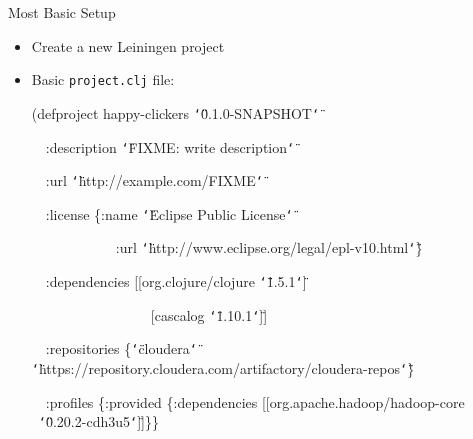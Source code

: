 \documentclass{beamer}
\renewcommand{\textquotedbl}{\texttt{\char`\"}}
\begin{document}
\begin{frame}[allowframebreaks]{Most Basic Setup}
  \begin{itemize}
  \item Create a new Leiningen project
  \item Basic \texttt{project.clj} file:\\
\begin{small}
{\ttfamily\color{black}
%
(defproject happy-clickers
\textcolor[rgb]{0.54509807,0.13333334,0.32156864}{{\textquotedbl}0.1.0-SNAPSHOT{\textquotedbl}}}

{\ttfamily\color{black}
\ \ \textcolor[rgb]{0.28235295,0.23921569,0.54509807}{:description}
\textcolor[rgb]{0.54509807,0.13333334,0.32156864}{{\textquotedbl}}\textcolor[rgb]{0.54509807,0.13333334,0.32156864}{FIXME:
write description{\textquotedbl}}}

{\ttfamily\color{black}
\ \ \textcolor[rgb]{0.28235295,0.23921569,0.54509807}{:url}
\textcolor[rgb]{0.54509807,0.13333334,0.32156864}{{\textquotedbl}http://example.com/FIXME{\textquotedbl}}}

{\ttfamily\color{black}
\ \ \textcolor[rgb]{0.28235295,0.23921569,0.54509807}{:license}
\{\textcolor[rgb]{0.28235295,0.23921569,0.54509807}{:name}
\textcolor[rgb]{0.54509807,0.13333334,0.32156864}{{\textquotedbl}Eclipse
Public License{\textquotedbl}}}

{\ttfamily\color{black}
\ \ \ \ \ \ \ \ \ \ \ \ \textcolor[rgb]{0.28235295,0.23921569,0.54509807}{:url}
\textcolor[rgb]{0.54509807,0.13333334,0.32156864}{{\textquotedbl}http://www.eclipse.org/legal/epl-v10.html{\textquotedbl}}\}}

{\ttfamily\color{black}
\ \ \textcolor[rgb]{0.28235295,0.23921569,0.54509807}{:dependencies}
[[org.clojure/clojure
\textcolor[rgb]{0.54509807,0.13333334,0.32156864}{{\textquotedbl}1.5.1{\textquotedbl}}]}

{\ttfamily\color{black}
\ \ \ \ \ \ \ \ \ \ \ \ \ \ \ \ \ [cascalog
\textcolor[rgb]{0.54509807,0.13333334,0.32156864}{{\textquotedbl}1.10.1{\textquotedbl}}]]}

{\ttfamily\color{black}
\ \ \textcolor[rgb]{0.28235295,0.23921569,0.54509807}{:repositories}
\{\textcolor[rgb]{0.54509807,0.13333334,0.32156864}{{\textquotedbl}cloudera{\textquotedbl}}
\textcolor[rgb]{0.54509807,0.13333334,0.32156864}{{\textquotedbl}https://repository.cloudera.com/artifactory/cloudera-repos{\textquotedbl}}\}}

{\ttfamily\color{black}
\ \ \textcolor[rgb]{0.28235295,0.23921569,0.54509807}{:profiles}
\{\textcolor[rgb]{0.28235295,0.23921569,0.54509807}{:provided}
\{\textcolor[rgb]{0.28235295,0.23921569,0.54509807}{:dependencies}
[[org.apache.hadoop/hadoop-core
\ \textcolor[rgb]{0.54509807,0.13333334,0.32156864}{{\textquotedbl}0.20.2-cdh3u5{\textquotedbl}}]]\}\}}


\end{small}
\end{itemize}
\end{frame}
\end{document}
